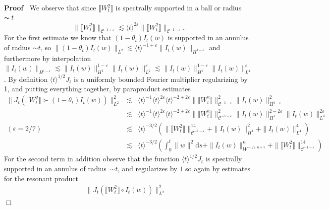 \documentclass[11pt]{article}
\newcommand{\mathd}{\mathrm{d}}
\newenvironment{proof}{\noindent\textbf{Proof\ }}{\hspace*{\fill}$\Box$\medskip}
\newcommand{\VV}{\mathscr{C}}
\begin{document}
\begin{proof}
  We observe that since $\llbracket W_t^2 \rrbracket$ is spectrally supported
  in a ball or radius $\thicksim t$
  \[ \| \llbracket W_t^2 \rrbracket \|_{\VV^{- 1 + \varepsilon}} \lesssim
     \langle t \rangle^{2 \varepsilon} \| \llbracket W_t^2 \rrbracket
     \|_{\VV^{- 1 - \varepsilon}} . \]
  For the first estimate we know that $(1 - \theta_t) I_t (w)$ is supported in
  an annulus of radius $\sim t$, so $\| (1 - \theta_t) I_t (w) \|_{L^2}
  \lesssim \langle t \rangle^{- 1 + \varepsilon} \| I_t (w) \|_{H^{1 -
  \varepsilon}}$ and furthermore by interpolation $\| I_t (w) \|_{H^{1 -
  \varepsilon}} \lesssim \| I_t (w) \|^{1 - \varepsilon}_{H^1} \| I_t (w)
  \|^{\varepsilon}_{L^2} \lesssim \| I_t (w) \|^{1 - \varepsilon}_{H^1} \| I_t
  (w) \|^{\varepsilon}_{L^4}$. By definition $\langle t \rangle^{1 / 2} J_t$
  is a uniformly bounded Fourier multiplier regularizing by 1, and putting
  everything together, by paraproduct estimates
  \begin{eqnarray*}
    \| J_t (\llbracket W_t^2 \rrbracket \succ (1 - \theta_t) I_t (w))
    \|^2_{L^2} & \lesssim & \langle t \rangle^{- 1} \langle t \rangle^{2
    \varepsilon} \langle t \rangle^{- 2 + 2 \varepsilon} \| \llbracket W_t^2
    \rrbracket \|^2_{\VV^{- 1 - \varepsilon}} \| I_t (w) \|^2_{H^{1 -
    \varepsilon}}\\
    & \lesssim & \langle t \rangle^{- 1} \langle t \rangle^{2 \varepsilon}
    \langle t \rangle^{- 2 + 2 \varepsilon} \| \llbracket W_t^2 \rrbracket
    \|^2_{\VV^{- 1 - \varepsilon}} \| I_t (w) \|^{2 - 2 \varepsilon}_{H^1} \|
    I_t (w) \|^{2 \varepsilon}_{L^4}\\
    \scriptstyle{(\varepsilon = 2 / 7)} \qquad & \lesssim & \langle t \rangle^{- 3 /
    2} \left( \| \llbracket W_t^2 \rrbracket \|^{14}_{\VV^{- 1 - \varepsilon}}
    + \| I_t (w) \|^2_{H^1} + \| I_t (w) \|^4_{L^4} \right)\\
    & \lesssim & \langle t \rangle^{- 3 / 2} \left( \int^t_0 \| w \|^2 \mathd
    s + \| I_t (w) \|^n_{W^{- 1 / 2, n + 1}} + \| \llbracket W_t^2 \rrbracket
    \|^{14}_{\VV^{- 1 - \varepsilon}} \right)
  \end{eqnarray*}
  For the second term in addition observe that the function $\langle t
  \rangle^{1 / 2} J_t$ is spectrally supported in an annulus of radius~$\sim
  t$, and regularizes by $1$ so again by estimates for the resonant product
  \[ \begin{array}{lll}
       \| J_t (\llbracket W_t^2 \rrbracket \circ I_t (w)) \|^2_{L^2} &

\end{array}\]
\end{proof}
\end{document}
